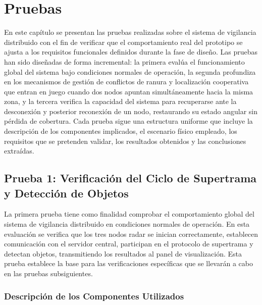 
\chapter{Pruebas}
\label{chap:pruebas}

En este capítulo se presentan las pruebas realizadas sobre el sistema de vigilancia distribuido con el fin de verificar que el comportamiento real del prototipo se ajusta a los requisitos funcionales definidos durante la fase de diseño. Las pruebas han sido diseñadas de forma incremental: la primera evalúa el funcionamiento global del sistema bajo condiciones normales de operación, la segunda profundiza en los mecanismos de gestión de conflictos de ranura y localización cooperativa que entran en juego cuando dos nodos apuntan simultáneamente hacia la misma zona, y la tercera verifica la capacidad del sistema para recuperarse ante la desconexión y posterior reconexión de un nodo, restaurando su estado angular sin pérdida de cobertura. Cada prueba sigue una estructura uniforme que incluye la descripción de los componentes implicados, el escenario físico empleado, los requisitos que se pretenden validar, los resultados obtenidos y las conclusiones extraídas.

\section{Prueba 1: Verificación del Ciclo de Supertrama y Detección de Objetos}

La primera prueba tiene como finalidad comprobar el comportamiento global del sistema de vigilancia distribuido en condiciones normales de operación. En esta evaluación se verifica que los tres nodos radar se inician correctamente, establecen comunicación con el servidor central, participan en el protocolo de supertrama y detectan objetos, transmitiendo los resultados al panel de visualización. Esta prueba establece la base para las verificaciones específicas que se llevarán a cabo en las pruebas subsiguientes.

\subsection{Descripción de los Componentes Utilizados}

